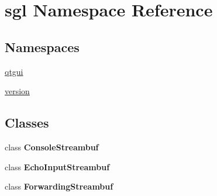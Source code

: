 \hypertarget{namespacesgl}{}\section{sgl Namespace Reference}
\label{namespacesgl}
\subsection*{Namespaces}
\begin{DoxyCompactItemize}
\item 
 \mbox{\hyperlink{namespacesgl_1_1qtgui}{qtgui}}
\item 
 \mbox{\hyperlink{namespacesgl_1_1version}{version}}
\end{DoxyCompactItemize}
\subsection*{Classes}
\begin{DoxyCompactItemize}
\item 
class {\bfseries Console\+Streambuf}
\item 
class {\bfseries Echo\+Input\+Streambuf}
\item 
class {\bfseries Forwarding\+Streambuf}
\end{DoxyCompactItemize}
